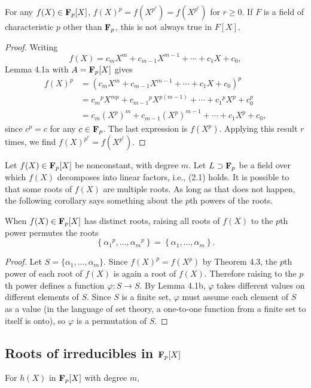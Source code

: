 \begin{theorem}
  For any $f(X)\in\mathbf{F}_p[X]$, $f(X)^p=f(X^{p^r})=f(X^{p^r})$ for $r\geq
  0$. If $F$ is a field of characteristic $p$ other than $\mathbf{F}_p$, this is
  not always true in $F[X]$.
\end{theorem}
\begin{proof}
  Writing
  \[
    f(X)=c_mX^m+c_{m-1}X^{m-1}+\cdots+c_1X+c_0,
  \]
  Lemma 4.1a with $A=\mathbf{F}_p[X]$ gives
  \begin{align*}
    f(X)^p
    &=\left( c_mX^m+c_{m-1}X^{m-1}+\cdots+c_1X+c_0 \right)^p\\
    &={c_m}^pX^{mp}+{c_{m-1}}^pX^{p(m-1)}+\cdots+{c_1}^pX^p+c_0^p\\
    &=c_m{(X^p)}^m+c_{m-1}{(X^p)}^{m-1}+\cdots+c_1X^p+c_0,
  \end{align*}
  since $c^p=c$ for any $c\in\mathbf{F}_p$. The last expression is
  $f(X^p)$. Applying this result $r$ times, we find
  $f(X)^{p^r}=f(X^{p^r})$.
\end{proof}

Let $f(X)\in\mathbf{F}_p[X]$ be nonconstant, with degree $m$. Let
$L\supset\mathbf{F}_p$ be a field over which $f(X)$ decomposes into linear
factors, i.e., (2.1) holds. It is possible to that some roots of $f(X)$ are
multiple roots. As long as that does not happen, the following corollary
says something about the $p$th powers of the roots.

\begin{corollary}
  When $f(X)\in\mathbf{F}_p[X]$ has distinct roots, raising all roots of $f(X)$
  to the $p$th power permutes the roots
  \[
    \left\{{\alpha_1}^p,\ldots,{\alpha_m}^p\right\}=\left\{{\alpha_1},\ldots,{\alpha_m}\right\}.
  \]
\end{corollary}
\begin{proof}
  Let $S=\{\alpha_1,\ldots,\alpha_m\}$. Since $f(X)^p=f(X^p)$ by Theorem
  4.3, the $p$th power of each root of $f(X)$ is again a root of
  $f(X)$. Therefore raising to the $p$th power defines a function
  $\varphi\colon S\to S$. By Lemma 4.1b, $\varphi$ takes different values
  on different elements of $S$. Since $S$ is a finite set, $\varphi$ must
  assume each element of $S$ as a value (in the language of set theory, a
  one-to-one function from a finite set to itself is onto), so $\varphi$ is
  a permutation of $S$.
\end{proof}

\subsection[Roots of irreducibles in FpX]{Roots of irreducibles in
  $\mathbf{F}_p[X]$}
\begin{lemma}
  For $h(X)$ in $\mathbf{F}_p[X]$ with degree $m$,
\end{lemma}

